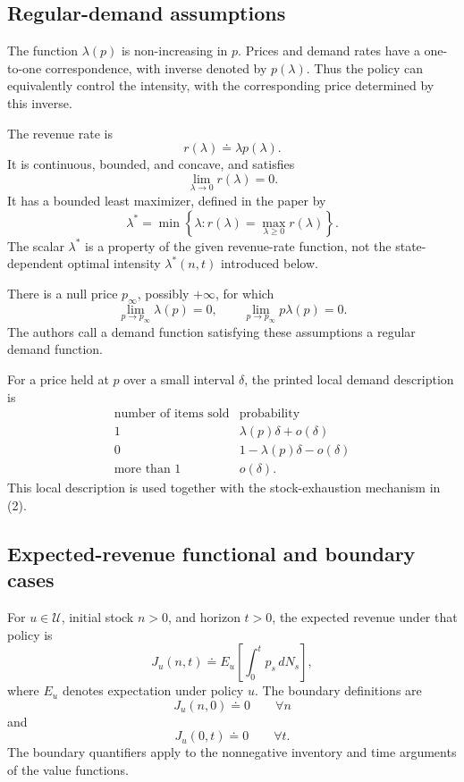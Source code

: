 \documentclass{article}
\begin{document}
\subsection*{Regular-demand assumptions}
The function $\lambda(p)$ is non-increasing in $p$. Prices and demand rates have a one-to-one correspondence, with inverse denoted by $p(\lambda)$. Thus the policy can equivalently control the intensity, with the corresponding price determined by this inverse.

The revenue rate is
\begin{equation}
r(\lambda)\doteq\lambda p(\lambda).
\tag{1}
\end{equation}
It is continuous, bounded, and concave, and satisfies
\[
\lim_{\lambda\to0}r(\lambda)=0.
\]
It has a bounded least maximizer, defined in the paper by
\[
\lambda^*=\min\left\{\lambda:
 r(\lambda)=\max_{\lambda\geq0}r(\lambda)\right\}.
\]
The scalar $\lambda^*$ is a property of the given revenue-rate function, not the state-dependent optimal intensity $\lambda^*(n,t)$ introduced below.

There is a null price $p_\infty$, possibly $+\infty$, for which
\[
\lim_{p\to p_\infty}\lambda(p)=0,
\qquad
\lim_{p\to p_\infty}p\lambda(p)=0.
\]
The authors call a demand function satisfying these assumptions a regular demand function.

For a price held at $p$ over a small interval $\delta$, the printed local demand description is
\[
\begin{array}{c|c}
\text{number of items sold}&\text{probability}\\ \hline
1&\lambda(p)\delta+o(\delta)\\
0&1-\lambda(p)\delta-o(\delta)\\
\text{more than }1&o(\delta).
\end{array}
\]
This local description is used together with the stock-exhaustion mechanism in (2).

\subsection*{Expected-revenue functional and boundary cases}
For $u\in\mathcal U$, initial stock $n>0$, and horizon $t>0$, the expected revenue under that policy is
\begin{equation}
J_u(n,t)\doteq E_u\left[\int_0^t p_s\,dN_s\right],
\tag{4}
\end{equation}
where $E_u$ denotes expectation under policy $u$. The boundary definitions are
\begin{equation}
J_u(n,0)\doteq0\qquad\forall n
\tag{5}
\end{equation}
and
\begin{equation}
J_u(0,t)\doteq0\qquad\forall t.
\tag{6}
\end{equation}
The boundary quantifiers apply to the nonnegative inventory and time arguments of the value functions.
\end{document}
